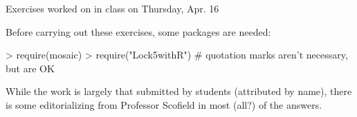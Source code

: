 \documentclass{article}
\begin{document}


\noindent
{\Large Exercises worked on in class on Thursday, Apr. 16}

\vspace{0.1in}
\noindent
Before carrying out these exercises, some packages are needed:
\begin{Schunk}
\begin{Sinput}
> require(mosaic)
> require("Lock5withR")    # quotation marks aren't necessary, but are OK
\end{Sinput}
\end{Schunk}

\vspace{0.1in}
\noindent
While the work is largely that submitted by students (attributed
by name), there is some editorializing from Professor Scofield
in most (all?) of the answers.
\end{document}
